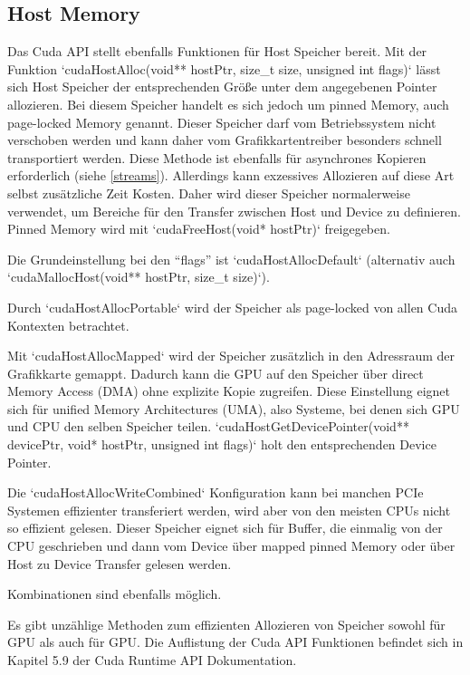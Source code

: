 		\subsection{Host Memory}
		Das Cuda \Gls{API} stellt ebenfalls Funktionen für Host Speicher bereit. Mit der Funktion \li`cudaHostAlloc(void** hostPtr, size_t size, unsigned int  flags)` lässt sich Host Speicher der entsprechenden Grö\ss e unter dem angegebenen Pointer allozieren. Bei diesem Speicher handelt es sich jedoch um pinned Memory, auch \gls{page-locked Memory} genannt. Dieser Speicher darf vom Betriebssystem nicht verschoben werden und kann daher vom Grafikkartentreiber besonders schnell transportiert werden. Diese Methode ist ebenfalls für asynchrones Kopieren erforderlich (siehe \ref{streams}). Allerdings kann exzessives Allozieren auf diese Art selbst zusätzliche Zeit Kosten. Daher wird dieser Speicher normalerweise verwendet, um Bereiche für den Transfer zwischen Host und Device zu definieren. Pinned Memory wird mit \li`cudaFreeHost(void* hostPtr)` freigegeben.
		
		Die Grundeinstellung bei den \enquote{flags} ist \li`cudaHostAllocDefault` (alternativ auch \li`cudaMallocHost(void** hostPtr, size_t size)`).
		
		Durch \li`cudaHostAllocPortable` wird der Speicher als page-locked von allen Cuda Kontexten betrachtet.
		
		Mit \li`cudaHostAllocMapped` wird der Speicher zusätzlich in den Adressraum der Grafikkarte gemappt. Dadurch kann die GPU auf den Speicher über direct Memory Access (DMA) ohne explizite Kopie zugreifen. Diese Einstellung eignet sich für unified Memory Architectures (UMA), also Systeme, bei denen sich GPU und CPU den selben Speicher teilen. \li`cudaHostGetDevicePointer(void** devicePtr, void* hostPtr, unsigned int flags)` holt den entsprechenden Device Pointer.
		
		Die \li`cudaHostAllocWriteCombined` Konfiguration kann bei manchen PCIe Systemen effizienter transferiert werden, wird aber von den meisten CPUs nicht so effizient gelesen. Dieser Speicher eignet sich für Buffer, die einmalig von der CPU geschrieben und dann vom Device über mapped pinned Memory oder über Host zu Device Transfer gelesen werden.
		
		Kombinationen sind ebenfalls möglich.
		
		Es gibt unzählige Methoden zum effizienten Allozieren von Speicher sowohl für GPU als auch für GPU. Die Auflistung der Cuda \Gls{API} Funktionen befindet sich in Kapitel 5.9 der Cuda Runtime API Dokumentation. \autocite{cudaRTAPI}
		
